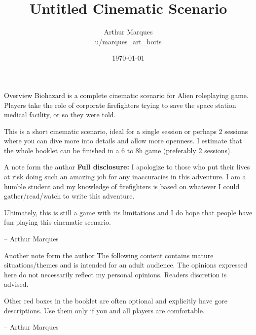 \documentclass[10pt,twoside,twocolumn]{book}
\title{Untitled Cinematic Scenario}
\date{\today}
\author{Arthur Marques \\ u/marques\_art\_boris}
\begin{document}
\selectfont %
\frontmatter

\maketitle


\begin{rpg-commentbox}{Overview}
  Biohazard is a complete cinematic scenario for Alien roleplaying game. Players take the role of corporate firefighters trying to save the space station medical facility, or so they were told.

  This is a short cinematic scenario, ideal for a single session or perhaps 2 sessions where you can dive more into details and allow more openness. I estimate that the whole booklet can be finished in a 6 to 8h game (preferably 2 sessions).
\end{rpg-commentbox}



\medskip
\begin{rpg-commentbox}{A note form the author}
  \textbf{Full disclosure:} I apologize to those who put their lives at risk doing such an amazing job for any inaccuracies in this adventure. I am a humble student and my knowledge of firefighters is based on whatever I could gather/read/watch to write this adventure. 
  
  Ultimately, this is still a game with its limitations and I do hope that people have fun playing this cinematic scenario.
  \begin{flushright}
  -- Arthur Marques
  \end{flushright}
\end{rpg-commentbox}



\begin{rpg-warnbox}{Another note form the author}
  The following content contains mature situations/themes and is intended for an adult audience. The opinions expressed here do not necessarily reflect my personal opinions. Readers discretion is advised.

  Other red boxes in the booklet are often optional and explicitly have gore descriptions. Use them only if you and all players are comfortable.

  \begin{flushright}
  -- Arthur Marques
  \end{flushright}
\end{rpg-warnbox}
\end{document}
